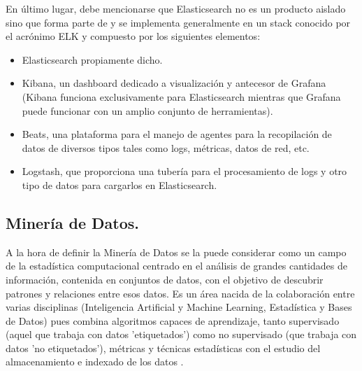 \documentclass[11pt, a4paper]{article} %
\begin{document}
En último lugar, debe mencionarse que Elasticsearch no es un producto aislado sino que forma parte de y se implementa generalmente en un stack conocido por el acrónimo ELK y compuesto por los siguientes elementos: \cite{elastic}
\begin{itemize}
\item Elasticsearch propiamente dicho.
\item Kibana, un dashboard dedicado a visualización y antecesor de Grafana (Kibana funciona exclusivamente para Elasticsearch mientras que Grafana puede funcionar con un amplio conjunto de herramientas).
\item Beats, una plataforma para el manejo de agentes para la recopilación de datos de diversos tipos tales como logs, métricas, datos de red, etc. 
\item Logstash, que proporciona una tubería para el procesamiento de logs y otro tipo de datos para cargarlos en Elasticsearch.
\end{itemize}
\subsection{Minería de Datos.}
A la hora de definir la Minería de Datos se la puede considerar como un campo de la estadística computacional centrado en el análisis de grandes cantidades de información, contenida en conjuntos de datos, con el objetivo de descubrir patrones y relaciones entre esos datos. Es un área nacida de la colaboración entre varias disciplinas (Inteligencia Artificial y Machine Learning, Estadística y Bases de Datos) pues combina algoritmos capaces de aprendizaje, tanto supervisado (aquel que trabaja con datos 'etiquetados') como no supervisado (que trabaja con datos 'no etiquetados'), métricas y técnicas estadísticas con el estudio del almacenamiento e indexado de los datos \cite{mineria}.
\end{document}
